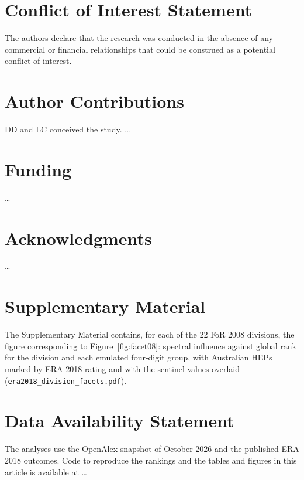 \documentclass[utf8]{FrontiersinHarvard}
\begin{document}






\section*{Conflict of Interest Statement}
The authors declare that the research was conducted in the absence of any commercial or financial relationships that could be construed as a potential conflict of interest.

\section*{Author Contributions}
DD and LC conceived the study. \ldots

\section*{Funding}
\ldots

\section*{Acknowledgments}
\ldots

\section*{Supplementary Material}
The Supplementary Material contains, for each of the 22 FoR 2008 divisions, the figure corresponding to Figure~\ref{fig:facet08}: spectral influence against global rank for the division and each emulated four-digit group, with Australian HEPs marked by ERA 2018 rating and with the sentinel values overlaid (\texttt{era2018\_division\_facets.pdf}).

\section*{Data Availability Statement}
The analyses use the OpenAlex snapshot of October 2026 \citep{priemOpenAlexFullyopenIndex2022} and the published ERA 2018 outcomes. Code to reproduce the rankings and the tables and figures in this article is available at \ldots



\end{document}
